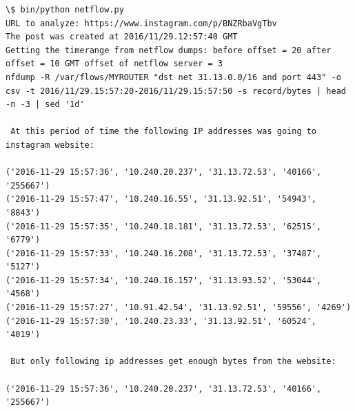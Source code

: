 \begin{lstlisting}
\$ bin/python netflow.py 
URL to analyze: https://www.instagram.com/p/BNZRbaVgTbv
The post was created at 2016/11/29.12:57:40 GMT
Getting the timerange from netflow dumps: before offset = 20 after offset = 10 GMT offset of netflow server = 3
nfdump -R /var/flows/MYROUTER "dst net 31.13.0.0/16 and port 443" -o csv -t 2016/11/29.15:57:20-2016/11/29.15:57:50 -s record/bytes | head -n -3 | sed '1d'

 At this period of time the following IP addresses was going to instagram website: 

('2016-11-29 15:57:36', '10.240.20.237', '31.13.72.53', '40166', '255667')
('2016-11-29 15:57:47', '10.240.16.55', '31.13.92.51', '54943', '8843')
('2016-11-29 15:57:35', '10.240.18.181', '31.13.72.53', '62515', '6779')
('2016-11-29 15:57:33', '10.240.16.208', '31.13.72.53', '37487', '5127')
('2016-11-29 15:57:34', '10.240.16.157', '31.13.93.52', '53044', '4568')
('2016-11-29 15:57:27', '10.91.42.54', '31.13.92.51', '59556', '4269')
('2016-11-29 15:57:30', '10.240.23.33', '31.13.92.51', '60524', '4019')

 But only following ip addresses get enough bytes from the website: 

('2016-11-29 15:57:36', '10.240.20.237', '31.13.72.53', '40166', '255667')

\end{lstlisting}
